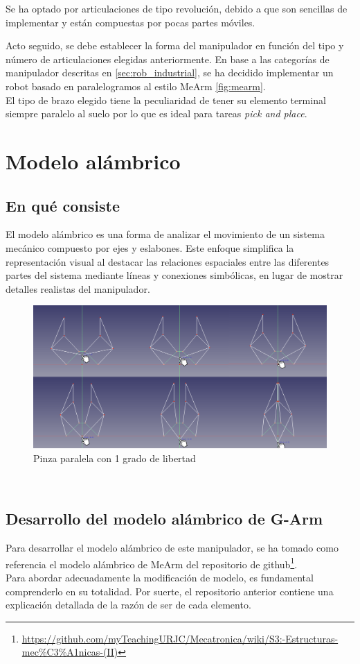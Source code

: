 Se ha optado por articulaciones de tipo revolución, debido a que son sencillas de implementar y están compuestas por pocas partes 
móviles.

\newpage
Acto seguido, se debe establecer la forma del manipulador en función del tipo y número de articulaciones elegidas anteriormente. 
En base a las categorías de manipulador descritas en \ref{sec:rob_industrial}, se ha decidido implementar un robot basado 
en paralelogramos al estilo MeArm \ref{fig:mearm}.
\\ 
El tipo de brazo elegido tiene la peculiaridad de tener su elemento terminal siempre paralelo al suelo por lo que es ideal para 
tareas \textit{pick and place}. 

\section{Modelo alámbrico}
\subsection{En qué consiste}
\label{subsec:eqc_mod_alambrico}
El modelo alámbrico es una forma de analizar el movimiento de un sistema mecánico compuesto por ejes y eslabones. Este 
enfoque simplifica la representación visual al destacar las relaciones espaciales entre las diferentes partes del sistema mediante 
líneas y conexiones simbólicas, en lugar de mostrar detalles realistas del manipulador. 
\begin{figure} [ht!]
  \begin{center}
    \includegraphics[width=15cm]{figs/pinza_evol.png}
  \end{center}
  \caption{Pinza paralela con 1 grado de libertad}
  \label{fig:mod_pinza_figure}
\end{figure}\ 

\newpage
\subsection{Desarrollo del modelo alámbrico de G-Arm}
\label{subsec:modelo_alambrico}
Para desarrollar el modelo alámbrico de este manipulador, se ha tomado como referencia el modelo alámbrico de MeArm del 
repositorio de github\footnote{\url{https://github.com/myTeachingURJC/Mecatronica/wiki/S3:-Estructuras-mec\%C3\%A1nicas-(II)}}. 
\\
Para abordar adecuadamente la modificación de modelo, es fundamental comprenderlo en su totalidad. Por suerte, el repositorio anterior  
contiene una explicación detallada de la razón de ser de cada elemento.

